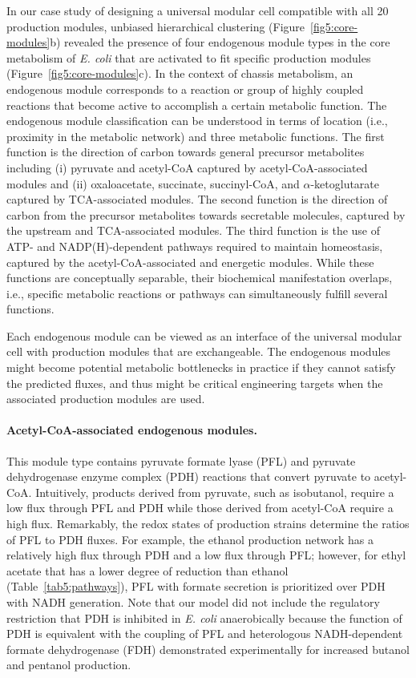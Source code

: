 In our case study of designing a universal modular cell compatible with all 20 production modules, unbiased hierarchical clustering (Figure~\ref{fig5:core-modules}b) revealed the presence of four endogenous module types in the core metabolism of \textit{E. coli} that are activated to fit specific production modules (Figure~\ref{fig5:core-modules}c).
In the context of chassis metabolism, an endogenous module corresponds to a reaction or group of highly coupled reactions that become active to accomplish a certain metabolic function.
The endogenous module classification can be understood in terms of location (i.e., proximity in the metabolic network) and three metabolic functions. The first function is the direction of carbon towards general precursor metabolites including (i) pyruvate and acetyl-CoA captured by acetyl-CoA-associated modules and (ii) oxaloacetate, succinate, succinyl-CoA, and $\alpha$-ketoglutarate captured by TCA-associated modules. The second function is the direction of carbon from the precursor metabolites towards secretable molecules, captured by the upstream and TCA-associated modules. The third function is the use of ATP- and NADP(H)-dependent pathways required to maintain homeostasis, captured by the acetyl-CoA-associated and energetic modules. While these functions are conceptually separable, their biochemical manifestation overlaps, i.e., specific metabolic reactions or pathways can simultaneously fulfill several functions.

Each endogenous module can be viewed as an interface of the universal modular cell with production modules that are exchangeable.
The endogenous modules might become potential metabolic bottlenecks in practice if they cannot satisfy the predicted fluxes, and thus might be critical engineering targets when the associated production modules are used.




\paragraph{Acetyl-CoA-associated endogenous modules.}
This module type contains pyruvate formate lyase (PFL) and pyruvate dehydrogenase enzyme complex (PDH) reactions that convert pyruvate to acetyl-CoA.
Intuitively, products derived from pyruvate, such as isobutanol, require a low flux through PFL and PDH while those derived from acetyl-CoA require a high flux.
Remarkably, the redox states of production strains determine the ratios of PFL to PDH  fluxes.
For example, the ethanol production network has a relatively high flux through PDH and a low flux through PFL; however, for ethyl acetate that has a lower degree of reduction than ethanol (Table~\ref{tab5:pathways}), PFL with formate secretion is prioritized over PDH with NADH  generation.
Note that our model did not include the regulatory restriction that PDH is inhibited in \textit{E. coli} anaerobically because the function of PDH is equivalent with the coupling of PFL and heterologous NADH-dependent formate dehydrogenase (FDH) demonstrated experimentally for increased butanol\citep{shen2011, nielsen2009} and pentanol\citep{tseng2012} production.

